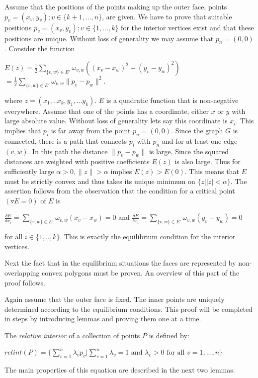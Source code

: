 \documentclass[11pt]{article}
\theoremstyle{definition}
\begin{document}
Assume that the positions of the points making up the outer face, points $p_v = (x_v,y_v); v \in \{k+1,...,n\}$, are given. We have to prove that suitable positions $p_v = (x_v,y_v); v \in \{1,...,k\}$ for the interior vertices exist and that these positions are unique. Without loss of generality we may assume that $p_n = (0,0)$. Consider the function
\begin{center}
$E(z) = \frac{1}{2} \sum\limits_{\{v,w\} \in E'} \omega_{v,w}((x_v - x_w)^2 + (y_v - y_w)^2)$ \\
$= \frac{1}{2} \sum\limits_{\{v,w\} \in E'} \omega_{v,w} \|p_v - p_w\|^2$. \\
\end{center}
where $z = (x_1,..x_k, y_1,...y_k)$.
$E$ is a quadratic function that is non-negative everywhere. Assume that one of the points has a coordinate, either $x$ or $y$ with large absolute value. Without loss of generality lets say this coordinate is $x_i$. This implies that $p_i$ is far away from the point $p_n = (0,0)$. Since the graph $G$ is connected, there is a path that connects $p_i$ with $p_n$ and for at least one edge $(v,w)$. In this path the distance $\|p_v - p_w\|$ is large. Since the squared distances are weighted with positive coefficients $E(z)$ is also large. Thus for sufficiently large $\alpha > 0, \|z\| > \alpha$ implies $E(z) > E(0)$. This means that $E$ must be strictly convex and thus takes its unique minimum on $\{z | |z| < \alpha \}$. The assertion follows from the observation that the condition for a critical point $(\triangledown E = 0)$ of $E$ is
\begin{center}
$\frac{\delta E}{\delta x_i} = \sum\limits_{\{v,w\} \in E'} \omega_{v,w}(x_v - x_w) = 0$ and $\frac{\delta E}{\delta x_i} = \sum\limits_{\{v,w\} \in E'} \omega_{v,w}(y_v - y_w) = 0$
\end{center}
for all $i \in \{1,..,k\}$. This is exactly the equilibrium condition for the interior vertices.

Next the fact that in the equilibrium situations the faces are represented by non-overlapping convex polygons must be proven. An overview of this part of the proof follows. 

Again assume that the outer face is fixed. The inner points are uniquely determined according to the equilibrium conditions. This proof will be completed in steps by introducing lemmas and proving them one at a time.

The \emph{relative interior} of a collection of points $P$ is defined by: 
\begin{center}
$relint(P) = \{\sum_{v=1}^{n} \lambda_vp_v | \sum_{v=1}^{n}\lambda_v =1 \mbox{ and } \lambda_v > 0 \mbox{ for all } v = 1,...,n\}$
\end{center}
The main properties of this equation are described in the next two lemmas. \\
\end{document}
